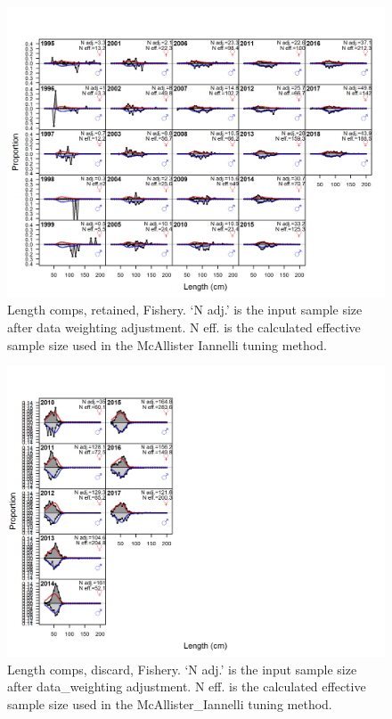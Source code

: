 \documentclass[12pt,]{article}
\begin{document}
\vspace{2.5cm}

\begin{figure}[!h]
\begin{centering}
\includegraphics{r4ss/plots_mod1/comp_lenfit_flt1mkt2.png}
\caption{Length comps, retained, Fishery. ‘N adj.’ is the input sample size after data weighting adjustment. N eff. is the calculated effective sample size used in the McAllister Iannelli tuning method.}\label{fig:comp_lenfit_flt1mkt2}
\end{centering}
\end{figure}

\begin{figure}
\centering
\includegraphics{./r4ss/plots_mod1/comp_lenfit_flt1mkt1.png}
\caption{Length comps, discard, Fishery. `N adj.' is the input sample
size after data\_weighting adjustment. N eff. is the calculated
effective sample size used in the McAllister\_Iannelli tuning method.
\label{fig:mod1_2_comp_lenfit_flt1mkt1}}
\end{figure}
\end{document}
